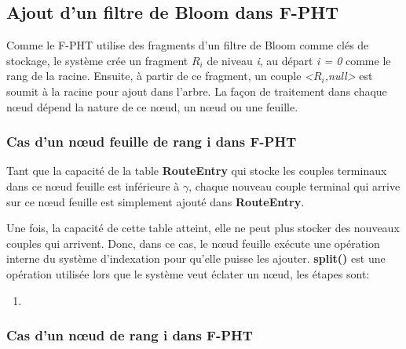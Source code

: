 \documentclass[a4paper,11pt]{report}
\begin{document}
\subsection{Ajout d'un filtre de Bloom dans F-PHT}
	Comme le F-PHT utilise des fragments d'un filtre de Bloom comme clés de stockage, le système crée un fragment \textit{$R_i$} de niveau \textit{i}, au départ \textit{i = 0} comme le rang de la racine. Ensuite, à partir de ce fragment, un couple \textit{<$R_i$,null>} est soumit à la racine pour ajout dans l'arbre. La façon de traitement dans chaque nœud dépend la nature de ce nœud, un nœud ou une feuille.

\subsubsection{Cas d'un nœud feuille de rang i dans F-PHT}
	Tant que la capacité de la table \textbf{RouteEntry} qui stocke les couples terminaux dans ce nœud feuille est inférieure à $\gamma$, chaque nouveau couple terminal qui arrive sur ce nœud feuille est simplement ajouté dans \textbf{RouteEntry}.

	Une fois, la capacité de cette table atteint, elle ne peut plus stocker des nouveaux couples qui arrivent. Donc, dans ce cas, le nœud feuille exécute une opération interne du système d'indexation pour qu'elle puisse les ajouter. \textbf{split()} est une opération utilisée lors que le système veut éclater un nœud, les étapes sont:
	\begin{enumerate}
		\item 
	\end{enumerate}
\subsubsection{Cas d'un nœud de rang i dans F-PHT}
	
	
\end{document}

